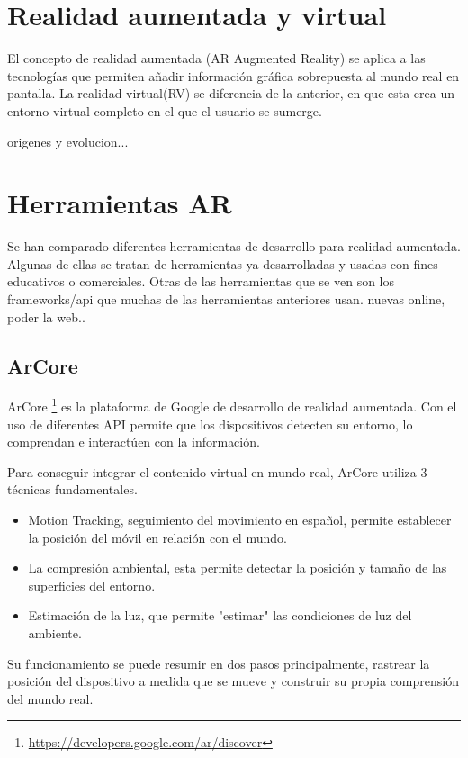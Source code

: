 

\section{Realidad aumentada y virtual}
El concepto de realidad aumentada (AR Augmented Reality) se aplica a las tecnologías que permiten añadir información gráfica sobrepuesta al mundo real en pantalla.
La realidad virtual(RV) se diferencia de la anterior, en que esta crea un entorno virtual completo en el que el usuario se sumerge.
 
origenes y evolucion...




\section{Herramientas AR}
Se han comparado diferentes herramientas de desarrollo para realidad aumentada. Algunas de ellas se tratan de herramientas ya desarrolladas y usadas con fines educativos o comerciales. Otras de las herramientas que se ven son los frameworks/api que muchas de las herramientas anteriores usan.
nuevas online, poder la web.. 

\subsection{ArCore}
ArCore \footnote{\url{https://developers.google.com/ar/discover}} es la plataforma de Google de desarrollo de realidad aumentada. Con el uso de diferentes API permite que los dispositivos detecten su entorno, lo comprendan e interactúen con la información.

Para conseguir integrar el contenido virtual en mundo real, ArCore utiliza 3 técnicas fundamentales.
\begin{itemize}
	\item Motion Tracking, seguimiento del movimiento en español, permite establecer la posición del móvil en relación con el mundo.
	\item La compresión ambiental, esta permite detectar la posición y tamaño de las superficies del entorno.
	\item Estimación de la luz, que permite "estimar" las condiciones de luz del ambiente.
\end{itemize}

Su funcionamiento se puede resumir en dos pasos principalmente, rastrear la posición del dispositivo a medida que se mueve y construir su propia comprensión del mundo real.

